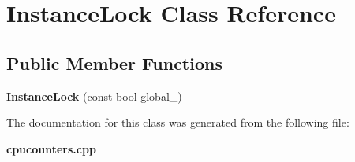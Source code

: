 \section{Instance\+Lock Class Reference}
\label{classInstanceLock}
\subsection*{Public Member Functions}
\begin{DoxyCompactItemize}
\item 
{\bfseries Instance\+Lock} (const bool global\+\_\+)\label{classInstanceLock_a9fa936c0a79760e8fe4e93a7bee72cb1}

\end{DoxyCompactItemize}


The documentation for this class was generated from the following file\+:\begin{DoxyCompactItemize}
\item 
{\bf cpucounters.\+cpp}\end{DoxyCompactItemize}
